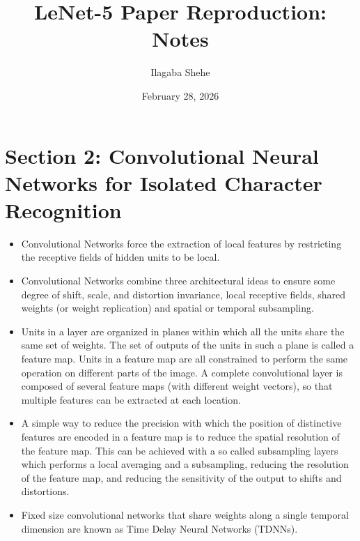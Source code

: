 \documentclass{article}
\title{LeNet-5 Paper Reproduction: Notes}
\author{Ilagaba Shehe}
\date{February 28, 2026}
\begin{document}
\maketitle

\section*{Section 2: Convolutional Neural Networks for
Isolated Character Recognition}
\begin{itemize}
    \item Convolutional Networks force the extraction of local features by restricting the receptive fields of hidden units to be local.
    \item Convolutional Networks combine three architectural ideas to ensure some degree of shift, scale, and distortion invariance, local receptive fields, shared weights (or weight replication) and spatial or temporal subsampling.
    \item Units in a layer are organized in planes within which all the units share the same set of weights. The set of outputs of the units in such a plane is called a feature map. Units in a feature map are all constrained to perform the same operation on different parts of the image. A complete convolutional layer is composed of several feature maps (with different weight vectors), so that multiple features can be extracted at each location.
    \item A simple way to reduce the precision with which the position of distinctive features are encoded in a feature map is to reduce the spatial resolution of the feature map. This can be achieved with a so called subsampling layers which performs a local averaging and a subsampling, reducing the resolution of the feature map, and reducing the sensitivity of the output to shifts and distortions.
    \item Fixed size convolutional networks that share weights along a single temporal dimension are known as Time Delay Neural Networks (TDNNs).
    
\end{itemize}
\end{document}
